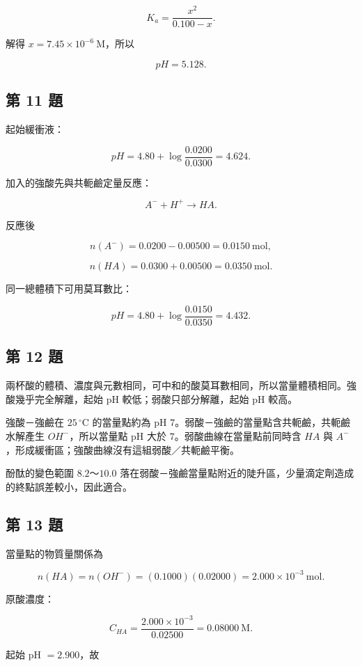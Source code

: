 \documentclass[11pt,a4paper]{article}
\begin{document}
\[
K_a=\frac{x^2}{0.100-x}.
\]

解得 \(x=7.45\times10^{-6}\ \mathrm M\)，所以

\[
pH=5.128.
\]

\subsection{第 11 題}\label{ux7b2c-11-ux984c}

起始緩衝液：

\[
pH=4.80+\log\frac{0.0200}{0.0300}=4.624.
\]

加入的強酸先與共軛鹼定量反應：

\[
A^-+H^+\rightarrow HA.
\]

反應後

\[
n(A^-)=0.0200-0.00500=0.0150\ \mathrm{mol},
\]

\[
n(HA)=0.0300+0.00500=0.0350\ \mathrm{mol}.
\]

同一總體積下可用莫耳數比：

\[
pH=4.80+\log\frac{0.0150}{0.0350}=4.432.
\]

\subsection{第 12 題}\label{ux7b2c-12-ux984c}

兩杯酸的體積、濃度與元數相同，可中和的酸莫耳數相同，所以當量體積相同。強酸幾乎完全解離，起始 pH 較低；弱酸只部分解離，起始 pH 較高。

強酸－強鹼在 \(25\,^\circ\mathrm C\) 的當量點約為 pH \(7\)。弱酸－強鹼的當量點含共軛鹼，共軛鹼水解產生 \(OH^-\)，所以當量點 pH 大於 \(7\)。弱酸曲線在當量點前同時含 \(HA\) 與 \(A^-\)，形成緩衝區；強酸曲線沒有這組弱酸／共軛鹼平衡。

酚酞的變色範圍 \(8.2\)～\(10.0\) 落在弱酸－強鹼當量點附近的陡升區，少量滴定劑造成的終點誤差較小，因此適合。

\subsection{第 13 題}\label{ux7b2c-13-ux984c}

當量點的物質量關係為

\[
n(HA)=n(OH^-)=(0.1000)(0.02000)
=2.000\times10^{-3}\ \mathrm{mol}.
\]

原酸濃度：

\[
C_{HA}=\frac{2.000\times10^{-3}}{0.02500}
=0.08000\ \mathrm M.
\]

起始 pH \(=2.900\)，故
\end{document}
